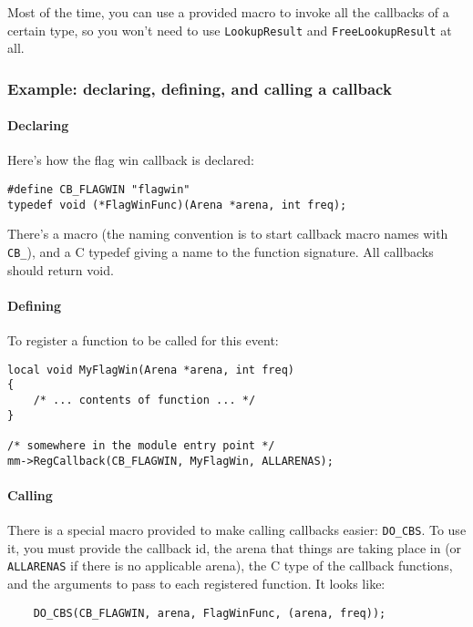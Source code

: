\documentclass{article}
\begin{document}
Most of the time, you can use a provided macro to invoke all the
callbacks of a certain type, so you won't need to use
\verb/LookupResult/ and \verb/FreeLookupResult/ at all.


\subsubsection{Example: declaring, defining, and calling a callback}

\paragraph{Declaring}
Here's how the flag win callback is declared:

\begin{verbatim}
#define CB_FLAGWIN "flagwin"
typedef void (*FlagWinFunc)(Arena *arena, int freq);
\end{verbatim}

There's a macro (the naming convention is to start callback macro names
with \verb/CB_/), and a C typedef giving a name to the function
signature. All callbacks should return void.

\paragraph{Defining}
To register a function to be called for this event:

\begin{verbatim}
local void MyFlagWin(Arena *arena, int freq)
{
    /* ... contents of function ... */
}

/* somewhere in the module entry point */
mm->RegCallback(CB_FLAGWIN, MyFlagWin, ALLARENAS);
\end{verbatim}

\paragraph{Calling}
There is a special macro provided to make calling callbacks easier:
\verb/DO_CBS/. To use it, you must provide the callback id, the arena
that things are taking place in (or \verb/ALLARENAS/ if there is no
applicable arena), the C type of the callback functions, and the
arguments to pass to each registered function. It looks like:

\begin{verbatim}
    DO_CBS(CB_FLAGWIN, arena, FlagWinFunc, (arena, freq));
\end{verbatim}
\end{document}
